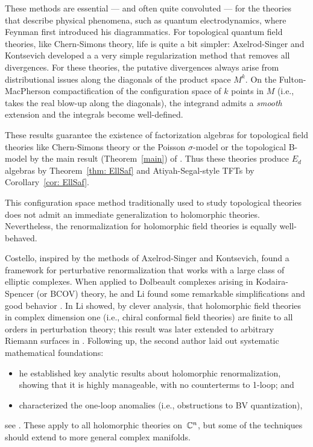 \documentclass[11pt]{amsart}
\begin{document}
These methods are essential --- and often quite convoluted --- for the theories that describe physical phenomena, 
such as quantum electrodynamics,
where Feynman first introduced his diagrammatics.
For topological quantum field theories, like Chern-Simons theory,
life is quite a bit simpler: Axelrod-Singer and Kontsevich developed a a very simple regularization method that removes all divergences.
For these theories, the putative divergences always arise from distributional issues along the diagonals of the product space $M^k$.
On the Fulton-MacPherson compactification of the configuration space of $k$ points in $M$ (i.e., takes the real blow-up along the diagonals),
the integrand admits a {\em smooth} extension and the integrals become well-defined.

These results guarantee the existence of factorization algebras for topological field theories like Chern-Simons theory or the Poisson $\sigma$-model or the topological B-model by the main result (Theorem~\ref{main}) of \cite{CG2}.
Thus these theories produce $E_d$ algebras by Theorem~\ref{thm: EllSaf} and Atiyah-Segal-style TFTs by Corollary~\ref{cor: EllSaf}.

This configuration space method traditionally used to study topological theories does not admit an immediate generalization to holomorphic theories.
Nevertheless, the renormalization for holomorphic field theories is equally well-behaved.

Costello, inspired by the methods of Axelrod-Singer and Kontsevich,
found a framework for perturbative renormalization that works with a large class of elliptic complexes.
When applied to Dolbeault complexes arising in Kodaira-Spencer (or BCOV) theory, 
he and Li found some remarkable simplifications and good behavior \cite{CLbcov}.
In \cite{LiVertex} Li showed, by clever analysis, that holomorphic field theories in complex dimension one (i.e., chiral conformal field theories) are finite to all orders in perturbation theory; 
this result was later extended to arbitrary Riemann surfaces in \cite{LiZhou}.
Following up, the second author laid out systematic mathematical foundations:
\begin{itemize}
\item he established key analytic results about holomorphic renormalization, 
showing that it is highly manageable, with no counterterms to 1-loop; and
\item characterized the one-loop anomalies  (i.e., obstructions to BV quantization),
\end{itemize}
see  \cite{Wthesis,Wrenorm}.
These apply to all holomorphic theories on~$\mathbb C^n$,
but some of the techniques should extend to more general complex manifolds.
\end{document}
